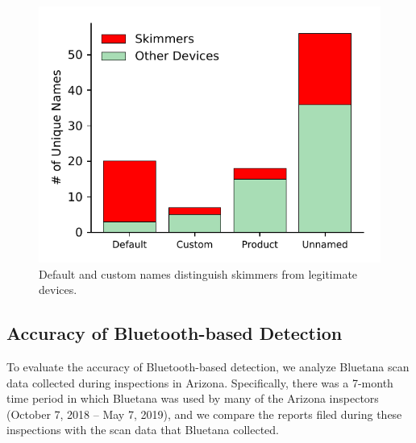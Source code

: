 \begin{figure}
    \centering
    \includegraphics[width=\linewidth]{plots/uncat_visit_hist_device_name.pdf}
    \caption{
    \label{fig:hist_device_name}
    Default and custom names distinguish skimmers from legitimate devices.
    }
\end{figure}


%

%






\subsection{Accuracy of Bluetooth-based Detection} %

To evaluate the accuracy of Bluetooth-based detection, we analyze Bluetana scan
data collected during inspections in Arizona. Specifically, there was a 7-month
time period in which Bluetana was used by many of the Arizona inspectors
(October 7, 2018 -- May 7, 2019), and we compare the reports filed during these
inspections with the scan data that Bluetana collected.

